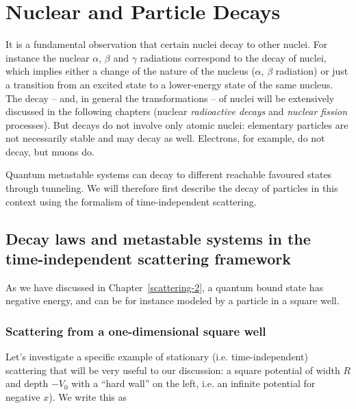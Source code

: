 %
%
%




\chapter{Nuclear and Particle Decays}
\label{decaylaws-I}

It is a fundamental observation that certain nuclei decay to other nuclei. For instance the nuclear $\alpha$, $\beta$ and $\gamma$ radiations correspond to the decay of nuclei, which implies either  a change of the nature of the nucleus ($\alpha$, $\beta$ radiation) or just a transition from an excited state to a lower-energy state of the same nucleus. The decay -- and, in general the transformations -- of nuclei will be extensively discussed in the following chapters (nuclear \emph{ radioactive decays} and \emph{ nuclear fission} processes). But decays do not involve only atomic nuclei:  elementary particles are not necessarily stable and may decay as well. Electrons, for example, do not decay, but muons do. 

Quantum metastable systems can decay to different reachable favoured states through tunneling. We will therefore first describe the decay of particles in this context using the formalism of time-independent scattering.  

\section{Decay laws and metastable systems in the time-independent scattering framework}

As we have discussed in Chapter~\ref{scattering-2}, a quantum bound state has negative energy, and can be for instance modeled by a particle in a square well.

\subsection{Scattering from a one-dimensional square well}

Let's investigate a specific example of stationary (i.e. time-independent) scattering that will be very useful to our discussion: a square potential of width $R$ and depth $-V_0$ with a ``hard wall'' on the left, i.e. an infinite potential for negative $x$). We write this as

